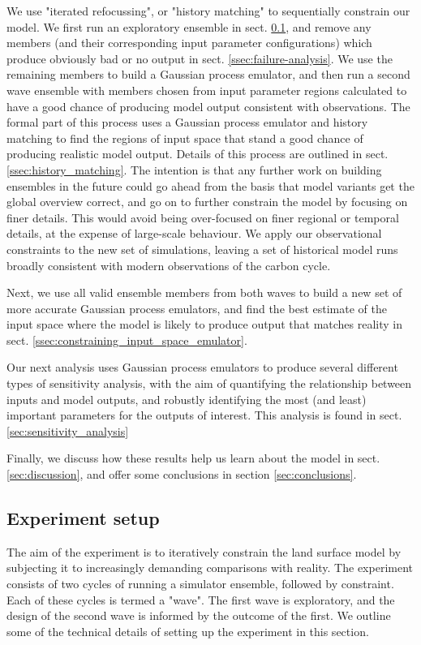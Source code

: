 \documentclass[gmd, manuscript]{copernicus}
\begin{document}
We use "iterated refocussing", or "history matching" to sequentially constrain our model.  We first run an exploratory ensemble in sect. \ref{ssec:experiment_setup}, and remove any members (and their corresponding input parameter configurations) which produce obviously bad or no output in sect. \ref{ssec:failure-analysis}. We use the remaining members to build a Gaussian process emulator, and then run a second wave ensemble with members chosen from input parameter regions calculated to have a good chance of producing model output consistent with observations. The formal part of this process uses a Gaussian process emulator and history matching to find the regions of input space that stand a good chance of producing realistic model output. Details of this process are outlined in sect. \ref{ssec:history_matching}. The intention is that any further work on building ensembles in the future could go ahead from the basis that model variants get the global overview correct, and go on to further constrain the model by focusing on finer details. This would avoid being over-focused on finer regional or temporal details, at the expense of large-scale behaviour. We apply our observational  constraints to the new set of simulations, leaving a set of historical model runs broadly consistent with modern observations of the carbon cycle.

Next, we use all valid ensemble members from both waves to build a new set of more accurate Gaussian process emulators, and find the best estimate of the input space where the model is likely to produce output that matches reality in sect. \ref{ssec:constraining_input_space_emulator}.

Our next analysis uses Gaussian process emulators to produce several different types of sensitivity analysis, with the aim of quantifying the relationship between inputs and model outputs, and robustly identifying the most (and least) important parameters for the outputs of interest. This analysis is found in sect. \ref{sec:sensitivity_analysis}

Finally, we discuss how these results help us learn about the model in sect. \ref{sec:discussion}, and offer some conclusions in section \ref{sec:conclusions}.

\subsection {Experiment setup}\label{ssec:experiment_setup}

The aim of the experiment is to iteratively constrain the land surface model by subjecting it to increasingly demanding comparisons with reality. The experiment consists of two cycles of running a simulator ensemble, followed by constraint. Each of these cycles is termed a "wave". The first wave is exploratory, and the design of the second wave is informed by the outcome of the first.  We outline some of the technical details of setting up the experiment in this section.
\end{document}
